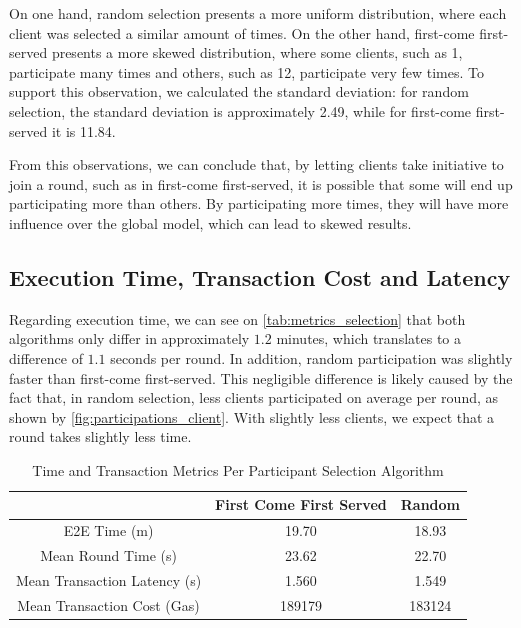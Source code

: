 On one hand, random selection presents a more uniform distribution, where each client was selected a similar amount of times. On the other hand, first-come first-served presents a more skewed distribution, where some clients, such as 1, participate many times and others, such as 12, participate very few times. To support this observation, we calculated the standard deviation: for random selection, the standard deviation is approximately 2.49, while for first-come first-served it is 11.84.

From this observations, we can conclude that, by letting clients take initiative to join a round, such as in first-come first-served, it is possible that some will end up participating more than others. By participating more times, they will have more influence over the global model, which can lead to skewed results.

\subsection{Execution Time, Transaction Cost and Latency}

Regarding execution time, we can see on \autoref{tab:metrics_selection} that both algorithms only differ in approximately $1.2$ minutes, which translates to a difference of $1.1$ seconds per round. In addition, random participation was slightly faster than first-come first-served. This negligible difference is likely caused by the fact that, in random selection, less clients participated on average per round, as shown by \autoref{fig:participations_client}. With slightly less clients, we expect that a round takes slightly less time.

\begin{table}[!ht]
\begin{tabular}{c|c|c} \hline \hline
                              & First Come First Served & Random \\ \hline \hline
E2E Time (m)                   & 19.70                   & 18.93  \\ \hline
Mean Round Time (s)            & 23.62                   & 22.70  \\ \hline
Mean Transaction Latency (s)   & 1.560                   & 1.549  \\ \hline
Mean Transaction Cost (Gas)    & 189179                  & 183124 \\ \hline
\end{tabular}
\caption{Time and Transaction Metrics Per Participant Selection Algorithm}
\label{tab:metrics_selection}
\end{table}

